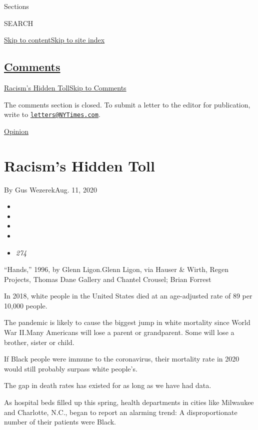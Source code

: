 Sections

SEARCH

\protect\hyperlink{site-content}{Skip to
content}\protect\hyperlink{site-index}{Skip to site index}

\hypertarget{comments}{%
\subsection{\texorpdfstring{\protect\hyperlink{commentsContainer}{Comments}}{Comments}}\label{comments}}

\href{}{Racism's Hidden Toll}\href{}{Skip to Comments}

The comments section is closed. To submit a letter to the editor for
publication, write to
\href{mailto:letters@NYTimes.com}{\nolinkurl{letters@NYTimes.com}}.

\href{/section/opinion}{Opinion}

\hypertarget{racisms-hidden-toll}{%
\section{Racism's Hidden Toll}\label{racisms-hidden-toll}}

By Gus WezerekAug. 11, 2020

\begin{itemize}
\item
\item
\item
\item
\item
  \emph{274}
\end{itemize}

``Hands,'' 1996, by Glenn Ligon.Glenn Ligon, via Hauser \& Wirth, Regen
Projects, Thomas Dane Gallery and Chantel Crousel; Brian Forrest

In 2018, white people in the United States died at an age-adjusted rate
of 89 per 10,000 people.

The pandemic is likely to cause the biggest jump in white mortality
since World War II.Many Americans will lose a parent or grandparent.
Some will lose a brother, sister or child.

If Black people were immune to the coronavirus, their mortality rate in
2020 would still probably surpass white people's.

The gap in death rates has existed for as long as we have had data.

As hospital beds filled up this spring, health departments in cities
like Milwaukee and Charlotte, N.C., began to report an alarming trend: A
disproportionate number of their patients were Black.

